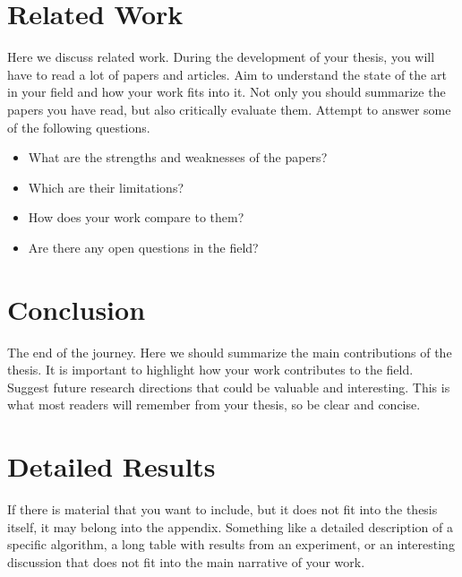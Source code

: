 \documentclass[thesis]{plai}
\begin{document}
\lipsum[2-4]


\chapter{Related Work}
\label{chapter:related-work}

Here we discuss related work.
During the development of your thesis, you will have to read a lot of papers and articles.
Aim to understand the state of the art in your field and how your work fits into it.
Not only you should summarize the papers you have read, but also critically evaluate them.
Attempt to answer some of the following questions.

\begin{itemize}
    \item What are the strengths and weaknesses of the papers?
    \item Which are their limitations?
    \item How does your work compare to them?
    \item Are there any open questions in the field?
\end{itemize}

\lipsum[4-5]


\chapter{Conclusion}
\label{chapter:conclusion}

The end of the journey.
Here we should summarize the main contributions of the thesis.
It is important to highlight how your work contributes to the field.
Suggest future research directions that could be valuable and interesting.
This is what most readers will remember from your thesis, so be clear and concise.

\lipsum[8]





\appendix

\chapter{Detailed Results}

If there is material that you want to include, but it does not fit into the thesis itself, it may belong into the appendix.
Something like a detailed description of a specific algorithm, a long table with results from an experiment, or an interesting discussion that does not fit into the main narrative of your work.
\end{document}
